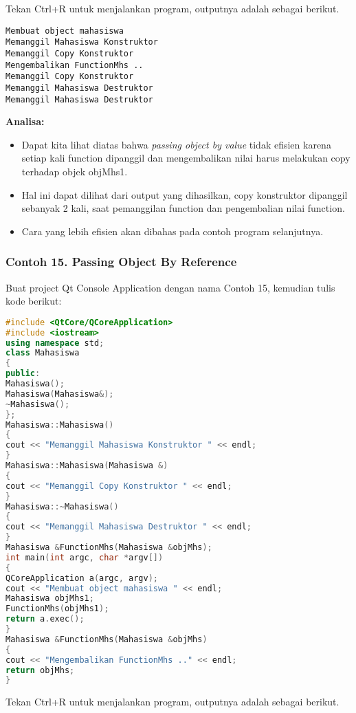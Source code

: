 Tekan Ctrl+R untuk menjalankan program, outputnya adalah sebagai
berikut.

\begin{verbatim}
Membuat object mahasiswa
Memanggil Mahasiswa Konstruktor
Memanggil Copy Konstruktor
Mengembalikan FunctionMhs ..
Memanggil Copy Konstruktor
Memanggil Mahasiswa Destruktor
Memanggil Mahasiswa Destruktor
\end{verbatim}

\textbf{Analisa:}

\begin{itemize}
\tightlist
\item
  Dapat kita lihat diatas bahwa \emph{passing object by value} tidak
  efisien karena setiap kali function dipanggil dan mengembalikan nilai
  harus melakukan copy terhadap objek objMhs1.
\item
  Hal ini dapat dilihat dari output yang dihasilkan, copy konstruktor
  dipanggil sebanyak 2 kali, saat pemanggilan function dan pengembalian
  nilai function.
\item
  Cara yang lebih efisien akan dibahas pada contoh program selanjutnya.
\end{itemize}

\subsubsection*{Contoh 15. Passing Object By Reference}

Buat project Qt Console Application dengan nama Contoh 15, kemudian
tulis kode berikut:

\begin{lstlisting}[language=c++]
#include <QtCore/QCoreApplication>
#include <iostream>
using namespace std;
class Mahasiswa
{
public:
Mahasiswa();
Mahasiswa(Mahasiswa&);
~Mahasiswa();
};
Mahasiswa::Mahasiswa()
{
cout << "Memanggil Mahasiswa Konstruktor " << endl;
}
Mahasiswa::Mahasiswa(Mahasiswa &)
{
cout << "Memanggil Copy Konstruktor " << endl;
}
Mahasiswa::~Mahasiswa()
{
cout << "Memanggil Mahasiswa Destruktor " << endl;
}
Mahasiswa &FunctionMhs(Mahasiswa &objMhs);
int main(int argc, char *argv[])
{
QCoreApplication a(argc, argv);
cout << "Membuat object mahasiswa " << endl;
Mahasiswa objMhs1;
FunctionMhs(objMhs1);
return a.exec();
}
Mahasiswa &FunctionMhs(Mahasiswa &objMhs)
{
cout << "Mengembalikan FunctionMhs .." << endl;
return objMhs;
}
\end{lstlisting}

Tekan Ctrl+R untuk menjalankan program, outputnya adalah sebagai
berikut.

